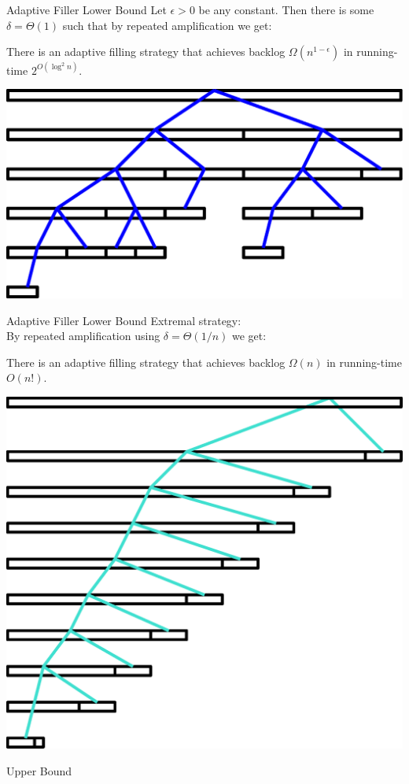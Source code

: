 \documentclass[xcolor=x11names, svgnames, rgb]{beamer}
\begin{document}
\begin{frame}[t]{Adaptive Filler Lower Bound}
  Let $\epsilon > 0$ be any constant. Then there is some $\delta=\Theta(1)$ such that by repeated amplification we get: 
  \begin{theorem}
    There is an adaptive filling strategy that achieves
    backlog $\Omega(n^{1-\epsilon})$  in running-time $2^{O(\log^2 n)}$.
  \end{theorem}
  \vspace{0.5cm}
  \includegraphics[width=0.7\linewidth]{amplificationImgs/quasipoly_cor.eps}
\end{frame}

\begin{frame}[t]{Adaptive Filler Lower Bound}
  Extremal strategy:\\
  By repeated amplification using $\delta=\Theta(1/n)$ we get: 
  \begin{theorem}
    There is an adaptive filling strategy that achieves backlog $\Omega(n)$ in running-time $O(n!)$.
  \end{theorem}
  \vspace{0.5cm}
  \includegraphics[width=0.45\linewidth]{amplificationImgs/expo_cor.eps}
\end{frame}

\begin{frame}[c]{}
  \begin{center}
    \Huge Upper Bound 
  \end{center}
\end{frame}
\end{document}
